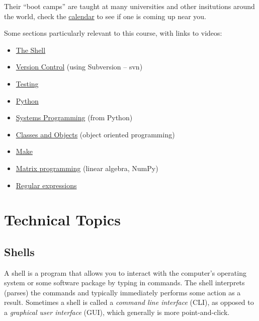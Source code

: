 \documentclass[letterpaper,10pt,english]{sphinxmanual}
\begin{document}
Their ``boot camps'' are taught at many universities and other insitutions
around the world, check the \href{http://software-carpentry.org/bootcamps/index.html\#calendar}{calendar} to see if
one is coming up near you.

Some sections particularly relevant to this course, with links to videos:
\begin{itemize}
\item {} 
\href{http://software-carpentry.org/4\_0/shell/}{The Shell}

\item {} 
\href{http://software-carpentry.org/4\_0/vc/}{Version Control}
(using Subversion -- svn)

\item {} 
\href{http://software-carpentry.org/4\_0/test/}{Testing}

\item {} 
\href{http://software-carpentry.org/4\_0/python/}{Python}

\item {} 
\href{http://software-carpentry.org/4\_0/sysprog/}{Systems Programming}
(from Python)

\item {} 
\href{http://software-carpentry.org/4\_0/oop/}{Classes and Objects}
(object oriented programming)

\item {} 
\href{http://software-carpentry.org/4\_0/make/}{Make}

\item {} 
\href{http://software-carpentry.org/4\_0/matrix/}{Matrix programming} (linear
algebra, NumPy)

\item {} 
\href{http://software-carpentry.org/4\_0/regexp/}{Regular expressions}

\end{itemize}


\chapter{Technical Topics}
\label{index:toc-technical-topics}\label{index:technical-topics}

\section{Shells}
\label{shells:id1}\label{shells::doc}\label{shells:shells}
A shell is a program that allows you to interact with the computer's
operating system or some software package by typing in commands.  The shell
interprets (parses) the commands and typically immediately performs some
action as a result.  Sometimes a shell is called a \emph{command line interface}
(CLI), as opposed to a \emph{graphical user interface} (GUI), which generally is
more point-and-click.
\end{document}
